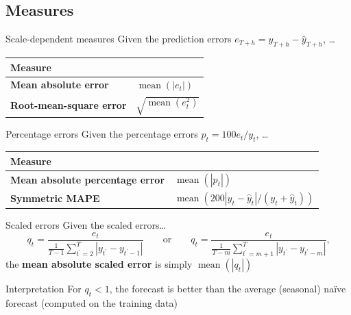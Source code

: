 \documentclass[12pt,aspectratio=169]{beamer}
\begin{document}
\subsection{Measures}

\begin{frame}{Scale-dependent measures}
    Given the prediction errors $e_{T + h} = y_{T + h} - \hat{y}_{T + h}$, \ldots
    \begin{center}
        \renewcommand{\arraystretch}{1.5}%
        \begin{tabular}{ll}
            \toprule
            \textbf{Measure} & \\
            \midrule
            \textbf{Mean absolute error}              & $\operatorname{mean}(|e_{t}|)$ \\
            \textbf{Root\hyp{}mean\hyp{}square error} & $\sqrt{\operatorname{mean}(e_{t}^{2})}$ \\
            \bottomrule
        \end{tabular}
    \end{center}
\end{frame}

\begin{frame}{Percentage errors}
    Given the \alert{percentage} errors $p_{t} = 100 e_{t} / y_{t}$, \ldots
    \begin{center}
        \renewcommand{\arraystretch}{1.5}%
        \begin{tabular}{ll}
            \toprule
            \textbf{Measure} & \\
            \midrule
            \textbf{Mean absolute percentage error} & $\operatorname{mean}(|p_{t}|)$ \\
            \textbf{Symmetric MAPE}                 & $\operatorname{mean}(200 |y_{t} - \hat{y}_{t}| / (y_{t} + \hat{y}_{t}))$ \\
            \bottomrule
        \end{tabular}
    \end{center}
\end{frame}

\begin{frame}{Scaled errors}
    Given the \alert{scaled} errors\ldots
    \[
        q_{t} = \frac{e_{t}}{\frac{1}{T-1} \sum_{t^{\prime} = 2}^{T} |y_{t^{\prime}} - y_{t^{\prime}-1}|}
        \qquad
        \text{or}
        \qquad
        q_{t} = \frac{e_{t}}{\frac{1}{T-m} \sum_{t^{\prime} = m+1}^{T} |y_{t^{\prime}} - y_{t^{\prime}-m}|}
        \text{,}
    \]
    the \textbf{mean absolute scaled error} is simply
    $\operatorname{mean}(|q_{t}|)$
    \vfill
    \begin{block}{Interpretation}
        For $q_{t} < 1$, the forecast is better than the average (seasonal)
        naïve forecast (computed on the training data)
    \end{block}
\end{frame}
\end{document}
